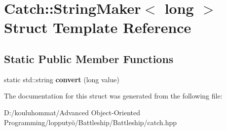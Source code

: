 \hypertarget{struct_catch_1_1_string_maker_3_01long_01_4}{}\section{Catch\+:\+:String\+Maker$<$ long $>$ Struct Template Reference}
\label{struct_catch_1_1_string_maker_3_01long_01_4}
\subsection*{Static Public Member Functions}
\begin{DoxyCompactItemize}
\item 
\mbox{\label{struct_catch_1_1_string_maker_3_01long_01_4_a1c0c56497813e7a6425c5411d5e66447}} 
static std\+::string {\bfseries convert} (long value)
\end{DoxyCompactItemize}


The documentation for this struct was generated from the following file\+:\begin{DoxyCompactItemize}
\item 
D\+:/kouluhommat/\+Advanced Object-\/\+Oriented Programming/lopputyö/\+Battleship/\+Battleship/catch.\+hpp\end{DoxyCompactItemize}

